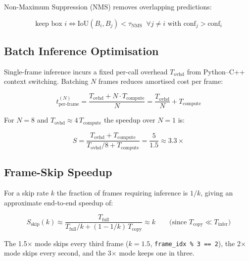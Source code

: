 \documentclass[12pt, a4paper]{article}
\begin{document}
Non-Maximum Suppression (NMS) removes overlapping predictions:

\begin{equation}
  \text{keep box } i \iff
  \text{IoU}(B_i, B_j) < \tau_{\text{NMS}}
  \;\;\forall j \neq i \text{ with } \text{conf}_j > \text{conf}_i
  \label{eq:nms}
\end{equation}

\subsection{Batch Inference Optimisation}

Single-frame inference incurs a fixed per-call overhead $T_{\text{ovhd}}$
from Python--C++ context switching. Batching $N$ frames reduces amortised
cost per frame:

\begin{equation}
  t_{\text{per-frame}}^{(N)}
  = \frac{T_{\text{ovhd}} + N \cdot T_{\text{compute}}}{N}
  = \frac{T_{\text{ovhd}}}{N} + T_{\text{compute}}
  \label{eq:batch_speedup}
\end{equation}

For $N = 8$ and $T_{\text{ovhd}} \approx 4\,T_{\text{compute}}$ the
speedup over $N=1$ is:

\begin{equation}
  S = \frac{T_{\text{ovhd}} + T_{\text{compute}}}
           {T_{\text{ovhd}}/8 + T_{\text{compute}}}
  = \frac{5}{1.5} \approx 3.3\times
  \label{eq:batch_speedup_calc}
\end{equation}

\subsection{Frame-Skip Speedup}

For a skip rate $k$ the fraction of frames requiring inference is $1/k$,
giving an approximate end-to-end speedup of:

\begin{equation}
  S_{\text{skip}}(k) \approx
  \frac{T_{\text{full}}}{T_{\text{full}}/k + (1 - 1/k)\,T_{\text{copy}}}
  \approx k
  \qquad \text{(since } T_{\text{copy}} \ll T_{\text{infer}}\text{)}
  \label{eq:frame_skip}
\end{equation}

The 1.5$\times$ mode skips every third frame ($k = 1.5$,
\texttt{frame\_idx \% 3 == 2}), the 2$\times$ mode skips every second,
and the 3$\times$ mode keeps one in three.

\end{document}
